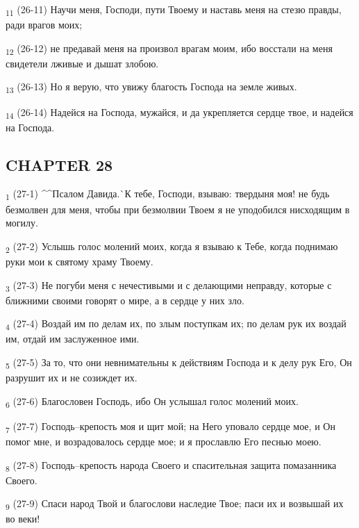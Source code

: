 \begin{tcolorbox}
\textsubscript{11} (26-11) Научи меня, Господи, пути Твоему и наставь меня на стезю правды, ради врагов моих;
\end{tcolorbox}
\begin{tcolorbox}
\textsubscript{12} (26-12) не предавай меня на произвол врагам моим, ибо восстали на меня свидетели лживые и дышат злобою.
\end{tcolorbox}
\begin{tcolorbox}
\textsubscript{13} (26-13) Но я верую, что увижу благость Господа на земле живых.
\end{tcolorbox}
\begin{tcolorbox}
\textsubscript{14} (26-14) Надейся на Господа, мужайся, и да укрепляется сердце твое, и надейся на Господа.
\end{tcolorbox}
\subsection{CHAPTER 28}
\begin{tcolorbox}
\textsubscript{1} (27-1) ^^Псалом Давида.^^ К тебе, Господи, взываю: твердыня моя! не будь безмолвен для меня, чтобы при безмолвии Твоем я не уподобился нисходящим в могилу.
\end{tcolorbox}
\begin{tcolorbox}
\textsubscript{2} (27-2) Услышь голос молений моих, когда я взываю к Тебе, когда поднимаю руки мои к святому храму Твоему.
\end{tcolorbox}
\begin{tcolorbox}
\textsubscript{3} (27-3) Не погуби меня с нечестивыми и с делающими неправду, которые с ближними своими говорят о мире, а в сердце у них зло.
\end{tcolorbox}
\begin{tcolorbox}
\textsubscript{4} (27-4) Воздай им по делам их, по злым поступкам их; по делам рук их воздай им, отдай им заслуженное ими.
\end{tcolorbox}
\begin{tcolorbox}
\textsubscript{5} (27-5) За то, что они невнимательны к действиям Господа и к делу рук Его, Он разрушит их и не созиждет их.
\end{tcolorbox}
\begin{tcolorbox}
\textsubscript{6} (27-6) Благословен Господь, ибо Он услышал голос молений моих.
\end{tcolorbox}
\begin{tcolorbox}
\textsubscript{7} (27-7) Господь--крепость моя и щит мой; на Него уповало сердце мое, и Он помог мне, и возрадовалось сердце мое; и я прославлю Его песнью моею.
\end{tcolorbox}
\begin{tcolorbox}
\textsubscript{8} (27-8) Господь--крепость народа Своего и спасительная защита помазанника Своего.
\end{tcolorbox}
\begin{tcolorbox}
\textsubscript{9} (27-9) Спаси народ Твой и благослови наследие Твое; паси их и возвышай их во веки!
\end{tcolorbox}
